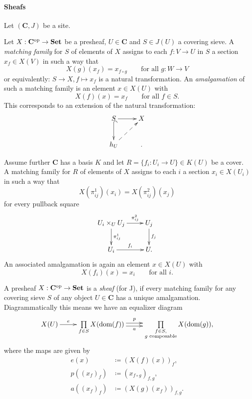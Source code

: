\documentclass{notes}
\def\C{\mathbf{C}}
\def\Set{\mathbf{Set}}
\def\op{\textup{op}}
\begin{document}
{\luca
	
	\paragraph{Sheafs}
	
	Let $(\C,J)$ be a site.
	
	\begin{definition}
		Let $X : \C^\op \rightarrow \Set$ be a presheaf, $U \in \C$ and $S \in J(U)$ a covering sieve.
		A \emph{matching family} for $S$ of elements of $X$ assigns to each $f : V \rightarrow U$ in $S$ a section $x_f \in X(V)$ in such a way that
		\begin{equation*}
			X(g)(x_f) = x_{f \circ g} \qquad \text{for all } g : W \rightarrow V
		\end{equation*}
		or equivalently: $S \rightarrow X, f \mapsto x_f$ is a natural transformation.
		An \emph{amalgamation} of such a matching family is an element $x \in X(U)$ with
		\begin{equation*}
			X(f)(x) = x_f \qquad \text{for all } f \in S.
		\end{equation*}
		This corresponds to an extension of the natural transformation:
		$$
		\xymatrix{
			S \ar@{^{(}->}[d] \ar[r] & X \\
			h_U \ar@{-->}[ur] &.
		}
		$$
		
		Assume further $\C$ has a basis $K$ and let $R = \{f_i : U_i \rightarrow U\} \in K(U)$ be a cover.
		A matching family for $R$ of elements of $X$ assigns to each $i$ a section $x_i \in X(U_i)$ in such a way that
		\begin{equation*}
			X(\pi_{ij}^1)(x_i) = X(\pi_{ij}^2)(x_j)
		\end{equation*}
		for every pullback square
		$$
		\xymatrix{
			U_i \times_U U_j \ar[d]^-{\pi_{ij}^1} \ar[r]^-{\pi_{ij}^2} & U_j \ar[d]^{f_j} \\
			U_i \ar[r]^{f_i} & U.
		}
		$$
		An associated amalgamation is again an element $x \in X(U)$ with
		\begin{equation*}
			X(f_i)(x) = x_i \qquad \text{for all } i.
		\end{equation*}
	\end{definition}
	
	\begin{definition}
		A presheaf $X : \C^\op \rightarrow \Set$ is a \emph{sheaf} (for J), if every matching family for any covering sieve $S$ of any object $U \in \C$ has a unique amalgamation.
		Diagrammatically this means we have an equalizer diagram
		\begin{equation*}
			\xymatrix{
				X(U) \ar[r]^-e & \prod\limits_{f \in S} X(\dom(f)) \ar@<0.5ex>[r]^-p \ar@<-0.5ex>[r]_-a & \prod\limits_{\substack{f \in S, \\ g \text{ composable}}} X(\dom(g)),
			}
		\end{equation*}
		where the maps are given by
		\begin{align*}
			e(x) & \coloneq (X(f)(x))_f, \\
			p((x_f)_f) & \coloneq (x_{f \circ g})_{f,g}, \\
			a((x_f)_f) & \coloneq (X(g)(x_f))_{f,g}.
		\end{align*}
	\end{definition}
	
}
\end{document}
